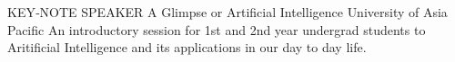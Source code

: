 \cventry
    {KEY‑NOTE SPEAKER}
    {A Glimpse or Artificial Intelligence }
    {University of Asia Pacific}
    {}
    {
      An introductory session for 1st and 2nd year undergrad students to Aritificial Intelligence and its applications in our day to day life.
    }